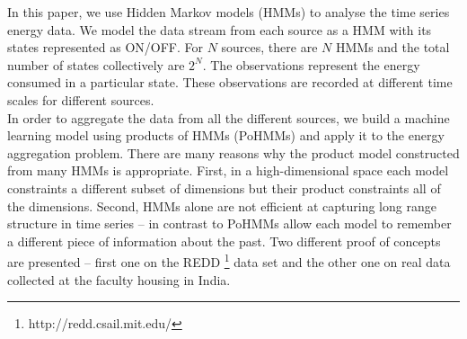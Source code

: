 \documentclass[runningheads,a4paper]{llncs}
\begin{document}
In this paper, we use Hidden Markov models (HMMs) to analyse the time series energy data.
We model the data stream from each source as a HMM with its states represented as ON/OFF.  For $N$ sources, there are $N$ HMMs and  the total number of states collectively are $2^N$. The observations represent the energy consumed in a particular state. These observations are recorded at different time scales for different sources. \\
In order to aggregate the data from all the different sources, we build a machine learning model using products of HMMs (PoHMMs) and apply it to the energy aggregation problem. There are many reasons why the product model constructed from many HMMs is appropriate. 
First, in a high-dimensional space each model constraints a different subset of dimensions but their product constraints all of the dimensions.
Second, HMMs alone are not efficient at capturing long range structure in time series \cite{Taylor} -- in contrast to PoHMMs  \cite{andrew} allow each model to remember a different piece of information about the past.
Two different proof of concepts are presented -- first one on the REDD \footnote{http://redd.csail.mit.edu/} data set and the other one on real data collected at the faculty housing in India. 

\end{document}
